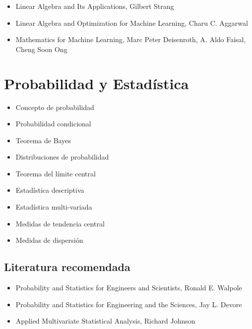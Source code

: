 \documentclass{article}
\begin{document}
            \begin{itemize}
                \item Linear Algebra and Its Applications, Gilbert Strang \cite{strang2006linear}
                \item Linear Algebra and Optimization for Machine Learning, Charu C. Aggarwal \cite{aggarwal2020linear}
                \item Mathematics for Machine Learning, Marc Peter Deisenroth, A. Aldo Faisal, Cheng Soon Ong \cite{deisenroth2020mathematics}
            \end{itemize}

    \section{Probabilidad y Estadística}

        \begin{itemize}
            \item Concepto de probabilidad
            \item Probabilidad condicional
            \item Teorema de Bayes
            \item Distribuciones de probabilidad
            \item Teorema del límite central
            \item Estadística descriptiva
            \item Estadística multi-variada
            \item Medidas de tendencia central
            \item Medidas de dispersión
        \end{itemize}

        \subsection{Literatura recomendada}

            \begin{itemize}
                \item Probability and Statistics for Engineers and Scientists, Ronald E. Walpole \cite{walpole1993probability}
                \item Probability and Statistics for Engineering and the Sciences, Jay L. Devore \cite{devore2011probability}
                \item Applied Multivariate Statistical Analysis, Richard Johnson \cite{johnson2014applied}
            \end{itemize}
    
    \clearpage
    
    
\end{document}

